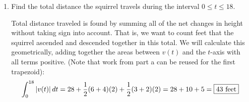 \documentclass{article}
\begin{document}
\begin{enumerate}
\begin{enumerate}

    
    

\item
\begin{problem}
    Find the total distance the squirrel travels during the interval $0\leq t \leq 18$.
\end{problem}

\begin{solution} 
Total distance traveled is found by summing all of the net changes in height without taking sign into account. That is, we want to count feet that the squirrel ascended and descended together in this total. We will calculate this geometrically, adding together the areas between $v(t)$ and the $t$-axis with all terms positive. (Note that work from part a can be reused for the first trapezoid):
\[ \int_0^{18}|v(t)|\,dt = 28+\frac{1}{2}(6+4)(2) + \frac{1}{2}(3+2)(2) = 28+10+5=\fbox{43 feet}\]
\end{solution}




\end{enumerate}
\end{enumerate}
\end{document}
